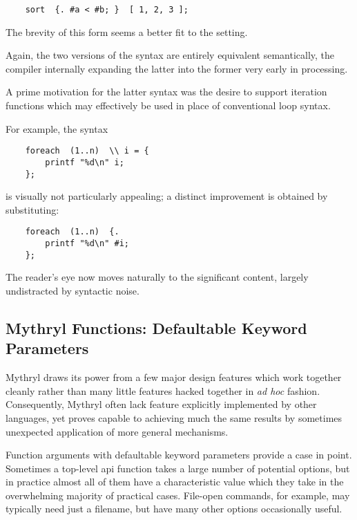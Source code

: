 \begin{verbatim}
    sort  {. #a < #b; }  [ 1, 2, 3 ];
\end{verbatim}

The brevity of this form seems a better fit to the setting.

Again, the two versions of the syntax are entirely equivalent semantically, 
the compiler internally expanding the latter into the former very early in processing.

A prime motivation for the latter syntax was the desire to support iteration 
functions which may effectively be used in place of conventional loop syntax.

For example, the syntax

\begin{verbatim}
    foreach  (1..n)  \\ i = {
        printf "%d\n" i;
    };
\end{verbatim}

is visually not particularly appealing;  a distinct improvement is obtained 
by substituting:

\begin{verbatim}
    foreach  (1..n)  {.
        printf "%d\n" #i;
    };
\end{verbatim}

The reader's eye now moves naturally to the significant 
content, largely undistracted by syntactic noise.


\cutend*

\subsection{Mythryl Functions:  Defaultable Keyword Parameters}

Mythryl draws its power from a few major design features which work together 
cleanly rather than many little features hacked together in {\it ad hoc} 
fashion.  Consequently, Mythryl often lack feature explicitly implemented 
by other languages, yet proves capable to achieving much the same results 
by sometimes unexpected application of more general mechanisms.

Function arguments with defaultable keyword parameters provide a case in 
point.  Sometimes a top-level api function takes a large number of potential 
options, but in practice almost all of them have a characteristic value which 
they take in the overwhelming majority of practical cases.  File-open commands, 
for example, may typically need just a filename, but have many other options 
occasionally useful.

